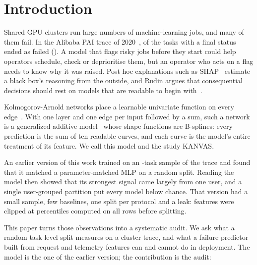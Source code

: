 \section{Introduction}
\label{sec:intro}

Shared GPU clusters run large numbers of machine-learning jobs, and many of them fail. In the Alibaba PAI trace of 2020~\cite{weng2022mlaas},  of the  tasks with a final status ended as failed (). A model that flags risky jobs before they start could help operators schedule, check or deprioritise them, but an operator who acts on a flag needs to know why it was raised. Post hoc explanations such as SHAP~\cite{lundberg2017shap} estimate a black box's reasoning from the outside, and Rudin argues that consequential decisions should rest on models that are readable to begin with~\cite{rudin2019stop}.

Kolmogorov-Arnold networks place a learnable univariate function on every edge~\cite{liu2025kan}. With one layer and one edge per input followed by a sum, such a network is a generalized additive model~\cite{hastie1986gam} whose shape functions are B-splines: every prediction is the sum of ten readable curves, and each curve is the model's entire treatment of its feature. We call this model \kaam{} and the study KANVAS.

An earlier version of this work trained \kaam{} on an -task sample of the trace and found that it matched a parameter-matched MLP on a random split. Reading the model then showed that its strongest signal came largely from one user, and a single user-grouped partition put every model below chance. That version had a small sample, few baselines, one split per protocol and a leak: features were clipped at percentiles computed on all rows before splitting.

This paper turns those observations into a systematic audit. We ask what a random task-level split measures on a cluster trace, and what a failure predictor built from request and telemetry features can and cannot do in deployment. The model is the one of the earlier version; the contribution is the audit:

